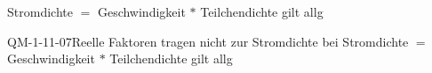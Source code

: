 Stromdichte $=$ Geschwindigkeit $*$ Teilchendichte gilt allg

\begin{REM}{QM-1-11-07}{Reelle Faktoren tragen nicht zur Stromdichte bei 
Stromdichte $=$ Geschwindigkeit $*$ Teilchendichte gilt allg}
\end{REM}
